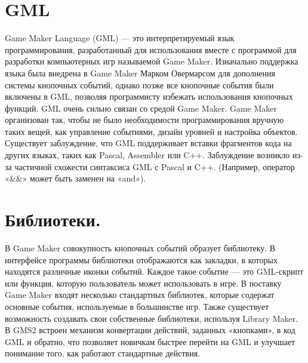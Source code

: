 \documentclass[14pt,article]{scrartcl}
\begin{document}


\section*{GML}
\onehalfspacing
Game Maker Language (GML) — это интерпретируемый язык программирования, разработанный для использования вместе с программой для разработки компьютерных игр называемой Game Maker. Изначально поддержка языка была внедрена в Game Maker Марком Овермарсом для дополнения системы кнопочных событий, однако позже все кнопочные события были включены в GML, позволяя программисту избежать использования кнопочных функций. GML очень сильно связан со средой Game Maker. Game Maker организован так, чтобы не было необходимости программирования вручную таких вещей, как управление событиями, дизайн уровней и настройка объектов. Существует заблуждение, что GML поддерживает вставки фрагментов кода на других языках, таких как Pascal, Assembler или C++. Заблуждение возникло из-за частичной схожести синтаксиса GML с Pascal и C++. (Например, оператор «\&\&» может быть заменен на «and»).
\section{Библиотеки.}
В Game Maker совокупность кнопочных событий образует библиотеку. В интерфейсе программы библиотеки отображаются как закладки, в которых находятся различные иконки событий. Каждое такое событие — это GML-скрипт или функция, которую пользователь может использовать в игре. В поставку Game Maker входят несколько стандартных библиотек, которые содержат основные события, используемые в большинстве игр. Также существует возможность создавать свои собственные библиотеки, используя Library Maker. В GMS2 встроен механизм конвертации действий, заданных «кнопками», в код GML и обратно, что позволяет новичкам быстрее перейти на GML и улучшает понимание того, как работают стандартные действия.
\end{document}
